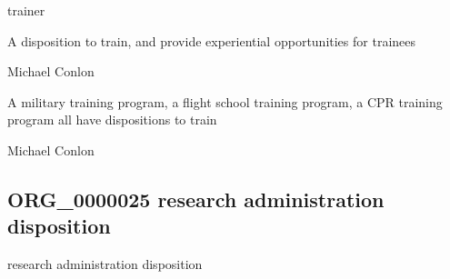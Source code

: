 \documentclass[letterpaper,10pt,english]{sphinxmanual}
\begin{document}
\begin{sphinxShadowBox}

\sphinxAtStartPar
trainer
\end{sphinxShadowBox}

\begin{sphinxShadowBox}

\sphinxAtStartPar
{\hyperref[\detokenize{doc-BFO_0000016::doc}]{}}
\end{sphinxShadowBox}

\begin{sphinxShadowBox}

\sphinxAtStartPar
A disposition to train, and provide experiential opportunities for trainees
\end{sphinxShadowBox}

\begin{sphinxShadowBox}

\sphinxAtStartPar
Michael Conlon 
\end{sphinxShadowBox}

\begin{sphinxShadowBox}

\sphinxAtStartPar
A military training program, a flight school training program, a CPR training program all have dispositions to train
\end{sphinxShadowBox}

\begin{sphinxShadowBox}

\sphinxAtStartPar
Michael Conlon 
\end{sphinxShadowBox}
\begin{quote}

\ignorespaces \end{quote}


\subsection{ORG\_0000025 \sphinxhyphen{} research administration disposition}
\label{\detokenize{doc-ORG_0000025:org-0000025-research-administration-disposition}}\label{\detokenize{doc-ORG_0000025:index-0}}\label{\detokenize{doc-ORG_0000025::doc}}
\begin{sphinxShadowBox}

\sphinxAtStartPar
research administration disposition
\end{sphinxShadowBox}
\end{document}
